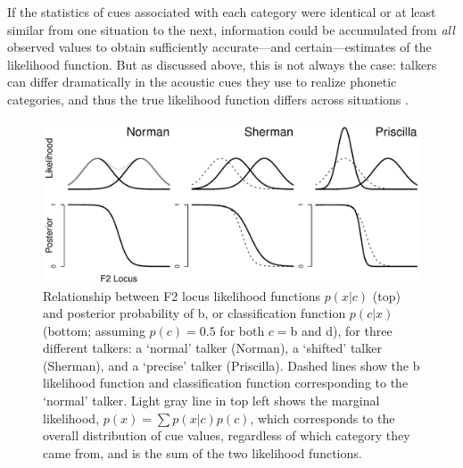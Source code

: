 If the statistics of cues associated with each category were identical or at least similar from one situation to the next, information could be accumulated from \emph{all} observed values to obtain sufficiently accurate---and certain---estimates of the likelihood function.
But as discussed above, this is not always the case: talkers can differ dramatically in the acoustic cues they use to realize phonetic categories, and thus the true likelihood function differs across situations \autocite{Allen2003,Labov1972,Hillenbrand1995,McMurray2011a,Pierrehumbert2003}.

\begin{figure}[t]
  \centering
  \includegraphics[width=\textwidth]{figs/dist-id-shift-var-schematic.pdf}
  \caption{Relationship between F2 locus likelihood functions $p(x | c)$ (top) and posterior probability of \ph b, or classification function $p(c | x)$ (bottom; assuming $p(c)=0.5$ for both $c=$\ph b and \ph d), for three different talkers: a `normal' talker (Norman), a `shifted' talker (Sherman), and a `precise' talker (Priscilla).  Dashed lines show the \ph b likelihood function and classification function corresponding to the `normal' talker.  Light gray line in top left shows the marginal likelihood, $p(x) = \sum p(x | c) p(c)$, which corresponds to the overall distribution of cue values, regardless of which category they came from, and is the sum of the two likelihood functions.}
  \label{fig:dist-id-schematic}
\end{figure}

